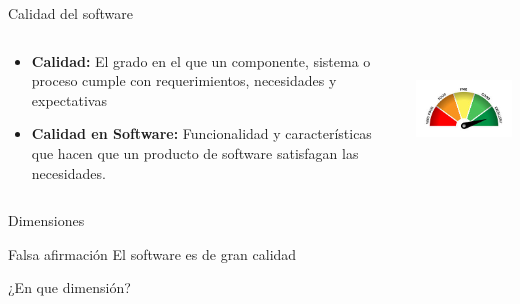 \documentclass[aspectratio=169]{beamer}
\begin{document}
\begin{frame}{Calidad del software}
\begin{columns}[T]
	\begin{column}[T]{5cm}
		\begin{itemize}
			\item \textbf{Calidad:} El grado en el que un componente, sistema o proceso cumple con requerimientos, necesidades y expectativas
			\item \textbf{Calidad en Software:} Funcionalidad y características que hacen que un producto de software satisfagan las necesidades.
		\end{itemize}
	\end{column}
	\begin{column}[T]{5cm} %
		\includegraphics[height=3cm]{Images/quality}
	\end{column}
\end{columns}
\end{frame}

\begin{frame}{Dimensiones}


\begin{block}{Falsa afirmación}
El software es de gran calidad
\end{block}

\pause
¿En que dimensión?
\end{frame}
\end{document}

